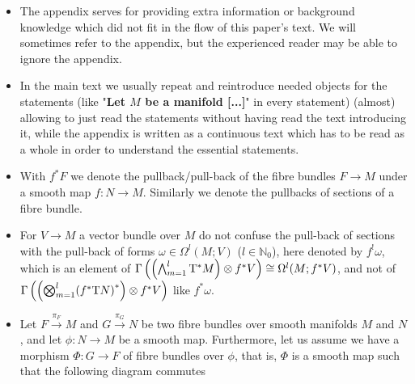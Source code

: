 \documentclass[a4paper,oneside,11pt,bibliography=totoc]{scrartcl}
\def\ba#1\ea{\begin{align}#1\end{align}}
\def\bas#1\eas{\begin{align*}#1\end{align*}}
\theoremstyle{plain}
\theoremstyle{remark}
\theoremstyle{definition}
\begin{document}
\begin{itemize}
	\item The appendix serves for providing extra information or background knowledge which did not fit in the flow of this paper's text. We will sometimes refer to the appendix, but the experienced reader may be able to ignore the appendix. 
	\item In the main text we usually repeat and reintroduce needed objects for the statements (like "\textbf{Let $M$ be a manifold [...]}" in every statement) (almost) allowing to just read the statements without having read the text introducing it, while the appendix is written as a continuous text which has to be read as a whole in order to understand the essential statements.
	\item With $f^*F$ we denote the pullback/pull-back of the fibre bundles $F \to M$ under a smooth map $f: N \to M$. Similarly we denote the pullbacks of sections of a fibre bundle.
	\item For $V \to M$ a vector bundle over $M$ do not confuse the pull-back of sections with the pull-back of forms $\omega \in \Omega^l(M; V)$ ($l \in \mathbb{N}_0$), here denoted by $f^!\omega$, which is an element of $\Gamma\left( \mleft(\bigwedge_{m=1}^{l} \mathrm{T}^*M \mright) \otimes f^*V \right) \cong \Omega^l(M; f^*V)$, and not of $\Gamma\left( \mleft(\bigotimes_{m=1}^{l} \mleft(f^*\mathrm{T}N\mright)^*\mright) \otimes f^*V \right)$ like $f^*\omega$. 
	\item Let $F \stackrel{\pi_F}{\to} M$ and $G \stackrel{\pi_G}{\to} N$ be two fibre bundles over smooth manifolds $M$ and $N$, and let $\phi: N \to M$ be a smooth map. Furthermore, let us assume we have a morphism $\Phi: G \to F$ of fibre bundles over $\phi$, that is, $\Phi$ is a smooth map such that the following diagram commutes

\end{itemize}
\end{document}
